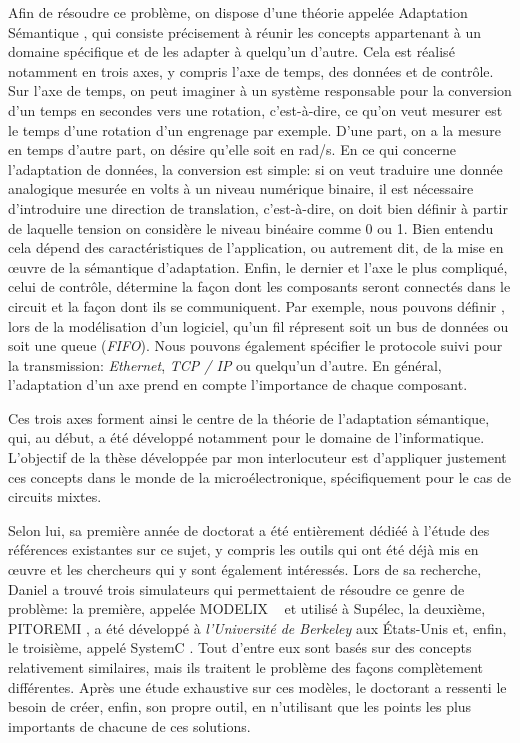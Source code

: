 \documentclass{article}
\begin{document}
\vspace{12pt}

Afin de résoudre ce problème, on dispose d'une théorie appelée \og Adaptation
Sémantique \fg, qui consiste précisement à réunir les concepts appartenant à un
domaine spécifique et de les adapter à quelqu'un d'autre. Cela est réalisé
notamment en trois axes, y compris l'axe de temps, des données et de contrôle.
Sur l'axe de temps, on peut imaginer à un système responsable
pour la conversion d'un temps en secondes vers une rotation, c'est-à-dire, ce
qu'on  veut mesurer est le temps d'une rotation d'un engrenage par exemple. 
D'une part, on a la mesure en temps d'autre part, on désire qu'elle soit en
rad/s. En ce qui concerne l'adaptation de données, la conversion  est simple:
si on veut traduire une donnée analogique mesurée en volts à un niveau numérique
binaire, il est nécessaire d'introduire une direction de translation,
c'est-à-dire, on doit bien définir à partir de laquelle tension on considère le
niveau binéaire comme 0 ou 1. Bien entendu cela dépend des caractéristiques de
l'application, ou autrement dit, de la mise en œuvre de la sémantique
d'adaptation. Enfin, le dernier et l'axe le plus compliqué, celui de contrôle,
détermine la façon dont les composants seront connectés dans le circuit et la
façon dont ils se communiquent. Par exemple, nous pouvons définir , lors de la
modélisation d'un logiciel, qu'un fil répresent soit un bus de données ou soit
une queue (\textit{FIFO}). Nous pouvons également spécifier le protocole suivi
pour la transmission: \textit{Ethernet}, \textit{TCP / IP} ou quelqu'un d'autre.
En général, l'adaptation d'un axe prend en compte l'importance de chaque
composant.

\vspace{12pt}

Ces trois axes forment ainsi le centre de la théorie de l'adaptation sémantique,
qui, au début, a été développé notamment pour le domaine de l'informatique.
L'objectif de la thèse développée par mon interlocuteur est d'appliquer
justement ces concepts dans le monde de la microélectronique, spécifiquement
pour le cas de circuits mixtes.

\vspace{12pt}

Selon lui, sa première année de doctorat a été entièrement dédiéé à l'étude
des références existantes sur ce sujet, y compris les outils qui ont été déjà
mis en œuvre et les chercheurs qui y sont également intéressés. Lors de sa
recherche, Daniel a trouvé trois simulateurs qui permettaient de résoudre ce
genre de problème: la première, appelée \og MODELIX \fg~ et utilisé à Supélec,
la deuxième, \og PITOREMI \fg, a été développé à \textit{l'Université de
Berkeley} aux États-Unis et, enfin, le troisième, appelé \og SystemC \fg. Tout
d'entre eux sont basés sur des concepts relativement similaires, mais ils
traitent le problème des façons complètement différentes. Après une étude
exhaustive sur ces modèles, le doctorant a ressenti le besoin de créer, enfin,
son propre outil, en n'utilisant que les points les plus importants de chacune
de ces solutions.
\end{document}
